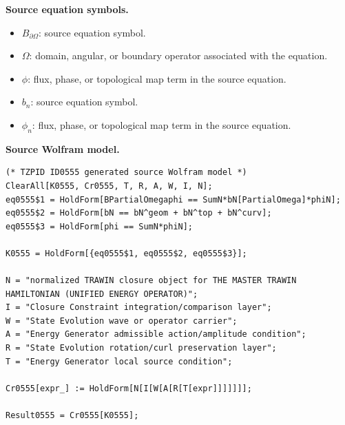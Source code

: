 \begin{minipage}[t]{0.49\linewidth}
\begingroup
\small
\raggedright
\textbf{Source equation symbols.}\par
\begin{itemize}[leftmargin=1.35em,itemsep=1pt,topsep=1pt,parsep=0pt]
    \item $B_{\partial\Omega}$: source equation symbol.
    \item $\Omega$: domain, angular, or boundary operator associated with the equation.
    \item $\phi$: flux, phase, or topological map term in the source equation.
    \item $b_n$: source equation symbol.
    \item $\phi_n$: flux, phase, or topological map term in the source equation.
\end{itemize}
\endgroup
\end{minipage}\hfill
\begin{minipage}[t]{0.47\linewidth}
\begingroup
\scriptsize
\raggedright
\textbf{Source Wolfram model.}\par
\begin{Verbatim}[fontsize=\tiny,breaklines=true,breakanywhere=true]
(* TZPID ID0555 generated source Wolfram model *)
ClearAll[K0555, Cr0555, T, R, A, W, I, N];
eq0555$1 = HoldForm[BPartialOmegaphi == SumN*bN[PartialOmega]*phiN];
eq0555$2 = HoldForm[bN == bN^geom + bN^top + bN^curv];
eq0555$3 = HoldForm[phi == SumN*phiN];

K0555 = HoldForm[{eq0555$1, eq0555$2, eq0555$3}];

N = "normalized TRAWIN closure object for THE MASTER TRAWIN HAMILTONIAN (UNIFIED ENERGY OPERATOR)";
I = "Closure Constraint integration/comparison layer";
W = "State Evolution wave or operator carrier";
A = "Energy Generator admissible action/amplitude condition";
R = "State Evolution rotation/curl preservation layer";
T = "Energy Generator local source condition";

Cr0555[expr_] := HoldForm[N[I[W[A[R[T[expr]]]]]]];

Result0555 = Cr0555[K0555];
\end{Verbatim}
\endgroup
\end{minipage}

